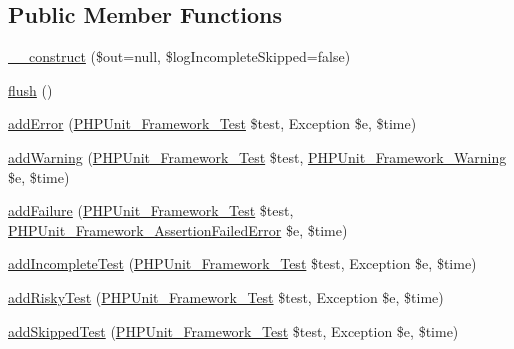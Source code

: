 \subsection*{Public Member Functions}
\begin{DoxyCompactItemize}
\item 
\mbox{\hyperlink{class_p_h_p_unit___util___log___j_unit_a627221d006a137113f79024660cf2735}{\+\_\+\+\_\+construct}} (\$out=null, \$log\+Incomplete\+Skipped=false)
\item 
\mbox{\hyperlink{class_p_h_p_unit___util___log___j_unit_a7751f77b5263bcf940ece6e824a05b38}{flush}} ()
\item 
\mbox{\hyperlink{class_p_h_p_unit___util___log___j_unit_a320d7bc7d2f9264ee7ba7aca6fd2df41}{add\+Error}} (\mbox{\hyperlink{interface_p_h_p_unit___framework___test}{P\+H\+P\+Unit\+\_\+\+Framework\+\_\+\+Test}} \$test, Exception \$e, \$time)
\item 
\mbox{\hyperlink{class_p_h_p_unit___util___log___j_unit_a6c3d134992c5b03573561ef82e7f743d}{add\+Warning}} (\mbox{\hyperlink{interface_p_h_p_unit___framework___test}{P\+H\+P\+Unit\+\_\+\+Framework\+\_\+\+Test}} \$test, \mbox{\hyperlink{class_p_h_p_unit___framework___warning}{P\+H\+P\+Unit\+\_\+\+Framework\+\_\+\+Warning}} \$e, \$time)
\item 
\mbox{\hyperlink{class_p_h_p_unit___util___log___j_unit_a668f17b68705c5c8686bac690a6f719d}{add\+Failure}} (\mbox{\hyperlink{interface_p_h_p_unit___framework___test}{P\+H\+P\+Unit\+\_\+\+Framework\+\_\+\+Test}} \$test, \mbox{\hyperlink{class_p_h_p_unit___framework___assertion_failed_error}{P\+H\+P\+Unit\+\_\+\+Framework\+\_\+\+Assertion\+Failed\+Error}} \$e, \$time)
\item 
\mbox{\hyperlink{class_p_h_p_unit___util___log___j_unit_a81bfe09a62194fe5769ca1cc36ee428b}{add\+Incomplete\+Test}} (\mbox{\hyperlink{interface_p_h_p_unit___framework___test}{P\+H\+P\+Unit\+\_\+\+Framework\+\_\+\+Test}} \$test, Exception \$e, \$time)
\item 
\mbox{\hyperlink{class_p_h_p_unit___util___log___j_unit_ad161e7d13b117cb0af3967cd2adc6bba}{add\+Risky\+Test}} (\mbox{\hyperlink{interface_p_h_p_unit___framework___test}{P\+H\+P\+Unit\+\_\+\+Framework\+\_\+\+Test}} \$test, Exception \$e, \$time)
\item 
\mbox{\hyperlink{class_p_h_p_unit___util___log___j_unit_a1c0cb3bc58e5807530daf3a93783ed4e}{add\+Skipped\+Test}} (\mbox{\hyperlink{interface_p_h_p_unit___framework___test}{P\+H\+P\+Unit\+\_\+\+Framework\+\_\+\+Test}} \$test, Exception \$e, \$time)
\item 

\end{DoxyCompactItemize}
